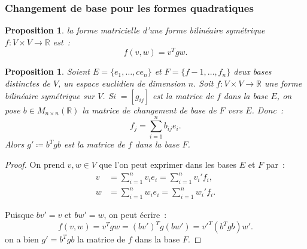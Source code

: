 \documentclass{article}
\newcommand{\R}{\mathbb R}
\newcommand{\M}[3]{M_{#1 \times #2}(#3)}
\newtheorem{prp}[thm]{Proposition}
\theoremstyle{definition}
\theoremstyle{remark}
\begin{document}
		\subsubsection{Changement de base pour les formes quadratiques}
		\begin{prp} la forme matricielle d'une forme bilinéaire symétrique $f : V \times V \to \R$ est~:
		\[f(v, w) = v^Tgw.\]
		\end{prp}

		\begin{prp} Soient $E = \{e_1, \dots,c e_n\}$ et $F = \{f-1, \dotsc, f_n\}$ deux bases distinctes de $V$, un espace euclidien de dimension $n$. Soit
		$f : V \times V \to \R$ une forme bilinéaire symétrique sur $V$. Si $ = [g_{ij}]$ est la matrice de $f$ dans la base $E$, on pose $b \in \M nn\R$ la
		matrice de changement de base de $F$ vers $E$. Donc~:
		\[f_j = \sum_{i=1}^nb_{ij}e_i.\]
		Alors $g' \coloneqq b^Tgb$ est la matrice de $f$ dans la base $F$.
		\end{prp}

		\begin{proof}
		On prend $v, w \in V$ que l'on peut exprimer dans les bases $E$ et $F$ par~:
		\begin{align*}
			v &= \sum_{i=1}^nv_ie_i = \sum_{i=1}^nv_i'f_i, \\
			w &= \sum_{i=1}^nw_ie_i = \sum_{i=1}^nw_i'f_i.
		\end{align*}

		Puisque $bv' = v$ et $bw' = w$, on peut écrire~:
		\[f(v, w) = v^Tgw = (bv')^Tg(bw') = v'^T(b^Tgb)w'.\]
		on a bien $g' = b^Tgb$ la matrice de $f$ dans la base $F$.
		\end{proof}
\end{document}
